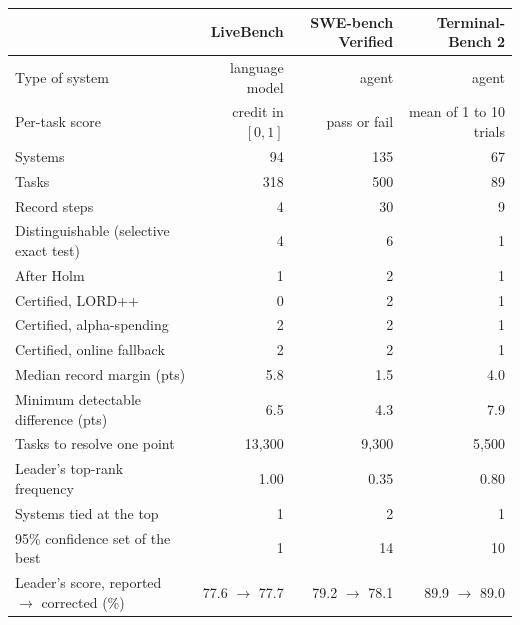 \begin{tabular}{lrrr}
\toprule
 & LiveBench & SWE-bench Verified & Terminal-Bench 2 \\
\midrule
Type of system & language model & agent & agent \\
Per-task score & credit in $[0,1]$ & pass or fail & mean of 1 to 10 trials \\
Systems & 94 & 135 & 67 \\
Tasks & 318 & 500 & 89 \\
Record steps & 4 & 30 & 9 \\
Distinguishable (selective exact test) & 4 & 6 & 1 \\
After Holm & 1 & 2 & 1 \\
Certified, LORD++ & 0 & 2 & 1 \\
Certified, alpha-spending & 2 & 2 & 1 \\
Certified, online fallback & 2 & 2 & 1 \\
Median record margin (pts) & 5.8 & 1.5 & 4.0 \\
Minimum detectable difference (pts) & 6.5 & 4.3 & 7.9 \\
Tasks to resolve one point & 13{,}300 & 9{,}300 & 5{,}500 \\
Leader's top-rank frequency & 1.00 & 0.35 & 0.80 \\
Systems tied at the top & 1 & 2 & 1 \\
95\% confidence set of the best & 1 & 14 & 10 \\
Leader's score, reported $\to$ corrected (\%) & 77.6 $\to$ 77.7 & 79.2 $\to$ 78.1 & 89.9 $\to$ 89.0 \\
\bottomrule
\end{tabular}
